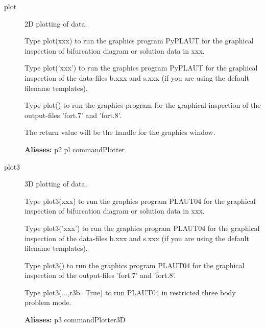 \documentclass[12pt]{report}
\begin{document}
\begin{description}
\item[plot]
2D plotting of data.

    Type plot(xxx) to run the graphics program PyPLAUT for the graphical
    inspection of bifurcation diagram or solution data in xxx.

    Type plot('xxx') to run the graphics program PyPLAUT for the graphical
    inspection of the data-files b.xxx and s.xxx (if you are using the
    default filename templates).

    Type plot() to run the graphics program for the graphical
    inspection of the output-files 'fort.7' and 'fort.8'.

    The return value will be the handle for the graphics window.
    
\textbf{Aliases:} p2 pl commandPlotter

\item[plot3]
3D plotting of data.

    Type plot3(xxx) to run the graphics program PLAUT04 for the graphical
    inspection of bifurcation diagram or solution data in xxx.

    Type plot3('xxx') to run the graphics program PLAUT04 for the graphical
    inspection of the data-files b.xxx and s.xxx (if you are using the
    default filename templates).

    Type plot3() to run the graphics program PLAUT04 for the graphical
    inspection of the output-files 'fort.7' and 'fort.8'.

    Type plot3(...,r3b=True) to run PLAUT04 in restricted three body
    problem mode.
    
\textbf{Aliases:} p3 commandPlotter3D
\end{description}
\end{document}
